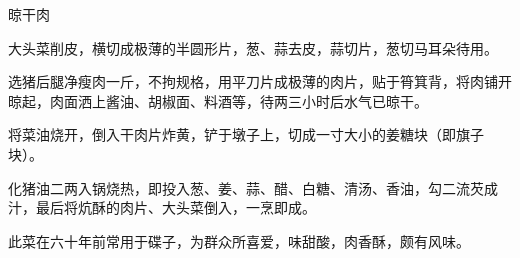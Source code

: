 %
%
%
%
%
%
%
\begin{recipe}{晾干肉}

\ingredients


\preparation

\step 大头菜削皮，横切成极薄的半圆形片，葱、蒜去皮，蒜切片，葱切马耳朵待用。

\step 选猪后腿净瘦肉一斤，不拘规格，用平刀片成极薄的肉片，贴于筲箕背，将肉铺开
晾起，肉面洒上酱油、胡椒面、料酒等，待两三小时后水气已晾干。

\step 将菜油烧开，倒入干肉片炸黄，铲于墩子上，切成一寸大小的姜糖块（即旗子块）。

\step 化猪油二两入锅烧热，即投入葱、姜、蒜、醋、白糖、清汤、香油，勾二流芡成
汁，最后将炕酥的肉片、大头菜倒入，一烹即成。

\features

此菜在六十年前常用于碟子，为群众所喜爱，味甜酸，肉香酥，颇有风味。

\end{recipe}

